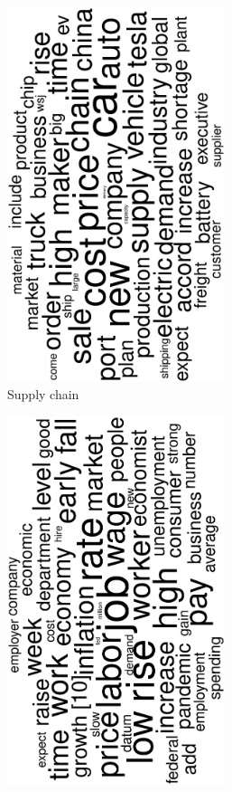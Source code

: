 \begin{figure}
\begin{subfigure}{0.32\textwidth}
		\includegraphics[width=0.7\textwidth,angle=270]{figures/wordcloud5.eps}
		\caption{Supply chain}
	\end{subfigure}
	\begin{subfigure}{0.32\textwidth}
		\includegraphics[width=0.7\textwidth,angle=270]{figures/wordcloud4.eps}

\end{subfigure}
\end{figure}
